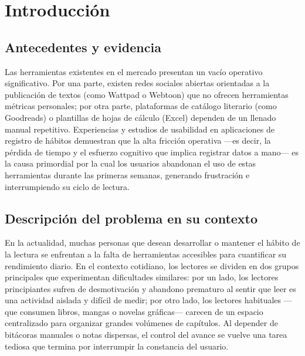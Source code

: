 \documentclass[12pt, atypical, journal]{article}
\begin{document}
\tableofcontents
\newpage

\section{Introducción}

\subsection{Antecedentes y evidencia}
Las herramientas existentes en el mercado presentan un vacío operativo significativo. Por una parte, existen redes sociales abiertas orientadas a la publicación de textos (como Wattpad o Webtoon) que no ofrecen herramientas métricas personales; por otra parte, plataformas de catálogo literario (como Goodreads) o plantillas de hojas de cálculo (Excel) dependen de un llenado manual repetitivo. Experiencias y estudios de usabilidad en aplicaciones de registro de hábitos demuestran que la alta fricción operativa —es decir, la pérdida de tiempo y el esfuerzo cognitivo que implica registrar datos a mano— es la causa primordial por la cual los usuarios abandonan el uso de estas herramientas durante las primeras semanas, generando frustración e interrumpiendo su ciclo de lectura.

\subsection{Descripción del problema en su contexto}
En la actualidad, muchas personas que desean desarrollar o mantener el hábito de la lectura se enfrentan a la falta de herramientas accesibles para cuantificar su rendimiento diario. En el contexto cotidiano, los lectores se dividen en dos grupos principales que experimentan dificultades similares: por un lado, los lectores principiantes sufren de desmotivación y abandono prematuro al sentir que leer es una actividad aislada y difícil de medir; por otro lado, los lectores habituales —que consumen libros, mangas o novelas gráficas— carecen de un espacio centralizado para organizar grandes volúmenes de capítulos. Al depender de bitácoras manuales o notas dispersas, el control del avance se vuelve una tarea tediosa que termina por interrumpir la constancia del usuario.
\end{document}
